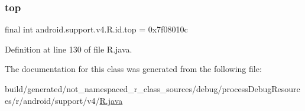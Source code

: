 \mbox{\label{classandroid_1_1support_1_1v4_1_1_r_1_1id_ac07fa206015ccb5a5bb0da6bbe642bc1}} 
\subsubsection{\texorpdfstring{top}{top}}
{\footnotesize\ttfamily final int android.\+support.\+v4.\+R.\+id.\+top = 0x7f08010c\hspace{0.3cm}{\ttfamily [static]}}



Definition at line 130 of file R.\+java.



The documentation for this class was generated from the following file\+:\begin{DoxyCompactItemize}
\item 
build/generated/not\+\_\+namespaced\+\_\+r\+\_\+class\+\_\+sources/debug/process\+Debug\+Resources/r/android/support/v4/\mbox{\hyperlink{android_2support_2v4_2_r_8java}{R.\+java}}\end{DoxyCompactItemize}
